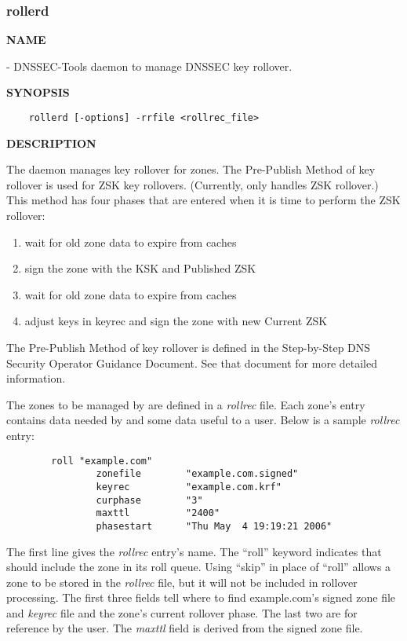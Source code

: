 \clearpage

\subsubsection{\bf rollerd}

{\bf NAME}

 - DNSSEC-Tools daemon to manage DNSSEC key rollover.

{\bf SYNOPSIS}

\begin{verbatim}
    rollerd [-options] -rrfile <rollrec_file>
\end{verbatim}

{\bf DESCRIPTION}

The  daemon manages key rollover for zones.  The Pre-Publish
Method of key rollover is used for ZSK key rollovers.  (Currently,
 only handles ZSK rollover.) This method has four phases that are
entered when it is time to perform the ZSK rollover:

\begin{enumerate}
\item wait for old zone data to expire from caches
\item sign the zone with the KSK and Published ZSK
\item wait for old zone data to expire from caches
\item adjust keys in keyrec and sign the zone with new Current ZSK
\end{enumerate}

The Pre-Publish Method of key rollover is defined in the Step-by-Step DNS
Security Operator Guidance Document.  See that document for more detailed
information.

The zones to be managed by  are defined in a {\it rollrec} file.
Each zone's entry contains data needed by  and some data useful
to a user.  Below is a sample {\it rollrec} entry:

\begin{verbatim}
        roll "example.com"
                zonefile        "example.com.signed"
                keyrec          "example.com.krf"
                curphase        "3"
                maxttl          "2400"
                phasestart      "Thu May  4 19:19:21 2006"
\end{verbatim}

The first line gives the {\it rollrec} entry's name.  The ``roll'' keyword
indicates that  should include the zone in its roll queue.  Using
``skip'' in place of ``roll'' allows a zone to be stored in the {\it rollrec}
file, but it will not be included in rollover processing.  The first three
fields tell  where to find example.com's signed zone file and
{\it keyrec} file and the zone's current rollover phase.  The last two are
for reference by the user.  The {\it maxttl} field is derived from the signed
zone file.

